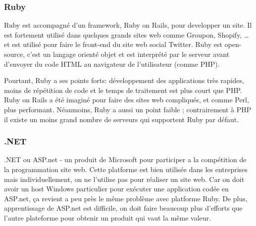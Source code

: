         \subsubsection{Ruby}
        \label{subsubsec:ruby}
        Ruby est accompagné d’un framework, Ruby on Rails, pour developper un site. Il est
        fortement utilisé dans quelques grands sites web comme Groupon, Shopify, … et est utilisé pour faire
        le front-end du site web social Twitter. Ruby est open-source, c’est un langage orienté objet et est
        interprété par le serveur avant d’envoyer du code HTML au navigateur de l’utilisateur (comme PHP).

        Pourtant, Ruby a ses points forts: développement des applications très rapides, moins de répétition
        de code et le temps de traitement est plus court que PHP. Ruby on Rails a été imaginé pour faire des
        sites web compliqués, et comme Perl, plus performant. Néanmoins, Ruby a aussi un point faible ;
        contrairement à PHP il existe un moins grand nombre de serveurs qui supportent Ruby par défaut.

        \subsubsection{.NET}
        \label{subsubsec:dotnet}
        .NET ou ASP.net - un produit de Microsoft pour participer a la compétition de la programmation site web.
        Cette platforme est bien utilisée dans les entreprises mais individuellement, on ne l’utilise pas pour
        réaliser un site web. Car on doit avoir un host Windows particulier pour exécuter une application codée
        en ASP.net, ça revient a peu près le même problème avec platforme Ruby. De plus, apprentissage de ASP.net
        est difficile, on doit faire beaucoup plus d’efforts que l’autre plateforme pour obtenir un produit qui vaut la même valeur.


